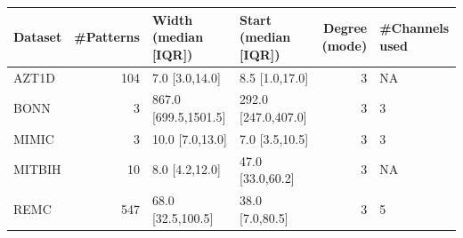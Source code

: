 \begin{tabular}{lrllrl}
\toprule
Dataset & #Patterns & Width (median [IQR]) & Start (median [IQR]) & Degree (mode) & #Channels used \\
\midrule
AZT1D & 104 & 7.0 [3.0,14.0] & 8.5 [1.0,17.0] & 3 & NA \\
BONN & 3 & 867.0 [699.5,1501.5] & 292.0 [247.0,407.0] & 3 & 3 \\
MIMIC & 3 & 10.0 [7.0,13.0] & 7.0 [3.5,10.5] & 3 & 3 \\
MITBIH & 10 & 8.0 [4.2,12.0] & 47.0 [33.0,60.2] & 3 & NA \\
REMC & 547 & 68.0 [32.5,100.5] & 38.0 [7.0,80.5] & 3 & 5 \\
\bottomrule
\end{tabular}
